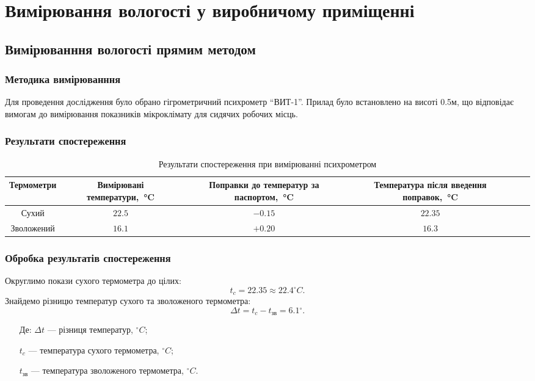 \chapter{Вимірювання вологості у виробничому приміщенні}

\section{Вимірюванння вологості прямим методом}

\subsection{Методика вимірюванння}

Для проведення дослідження було обрано гігрометричний психрометр ``ВИТ-1''.  Прилад було
встановлено на висоті 0.5м, що відповідає вимогам до вимірювання показників мікроклімату для сидячих
робочих місць.

\subsection{Результати спостереження}

\begin{table}[ht]
  \centering
  \caption{Результати спостереження при вимірюванні психрометром}
\label{t:results_direct}
\begin{tabular}{| c | c | c | c | c | c |}
\hline
\multicolumn{1}{|C{3cm}|}{Термометри} &
\multicolumn{1}{C{3.5cm}|}{Вимірювані температури,~°C} &
\multicolumn{1}{C{3.5cm}|}{Поправки до температур за паспортом,~°C} &
\multicolumn{1}{C{5cm}|}{Температура після введення поправок,~°C} \\ \hline 
Сухий  & $22.5$ & $-0.15$ & $22.35$ \\ \hline 
Зволожений & $16.1$ & $+0.20$ & $16.3$ \\ \hline 
\end{tabular}
\end{table}

\subsection{Обробка результатів спостереження}

Округлимо покази сухого термометра до цілих: 
\begin{equation}
  t_c = 22.35 \approx 22.4{^\circ}C.
\end{equation}
Знайдемо різницю температур сухого та зволоженого термометра:
\begin{equation}
\Delta t = t_{c}-t_{\text{зв}} = 6.1{^\circ}.
\end{equation}
\begin{itemize}
\item [Де:] $\Delta t$ --- різниця температур, ${^\circ}C$;
\item []$t_{c}$ ---  температура сухого термометра, ${^\circ}C$;
\item []$t_{\text{зв}}$ --- температура зволоженого термометра, ${^\circ}C$.
\end{itemize}

